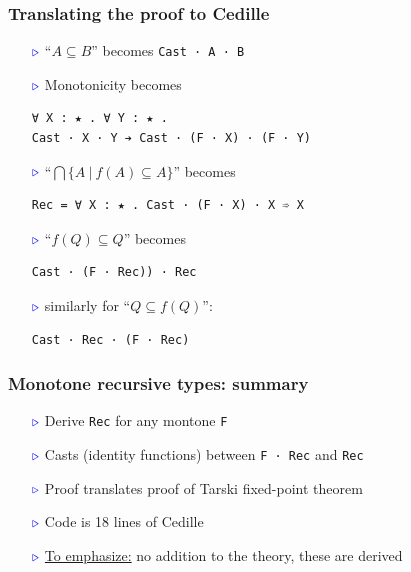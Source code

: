 \documentclass[11pt]{beamer}
\newcommand{\myb}[0]{\ensuremath{\textcolor{blue}{\triangleright}}}
\begin{document}
\begin{frame}[containsverbatim]
  \frametitle{Translating the proof to Cedille}

  \begin{itemize}
  \item[$\myb$] ``$A \subseteq B$'' becomes \verb|Cast · A · B|
  \item[$\myb$] Monotonicity becomes

    {\footnotesize
\begin{verbatim}
∀ X : ★ . ∀ Y : ★ . 
Cast · X · Y ➔ Cast · (F · X) · (F · Y) 
\end{verbatim}
}
  \item[$\myb$] ``$\bigcap\{ A\ |\ f(A) \subseteq A\}$'' becomes

{\footnotesize
\begin{verbatim}
Rec = ∀ X : ★ . Cast · (F · X) · X ➾ X 
\end{verbatim}
}

\item[$\myb$] ``$f(Q)\subseteq Q$'' becomes

{\footnotesize
\begin{verbatim}
Cast · (F · Rec)) · Rec 
\end{verbatim}
}

\item[$\myb$] similarly for ``$Q\subseteq f(Q)$'':

{\footnotesize
\begin{verbatim}
Cast · Rec · (F · Rec)
\end{verbatim}
}

\end{itemize}
\end{frame}

\begin{frame}[containsverbatim]
  \frametitle{Monotone recursive types: summary}

  \begin{itemize}
  \item[$\myb$] Derive \verb|Rec| for any montone \verb|F|
    \item[$\myb$] Casts (identity functions) between \verb|F · Rec| and \verb|Rec|
    \item[$\myb$] Proof translates proof of Tarski fixed-point theorem
    \item[$\myb$] Code is 18 lines of Cedille
\item[$\myb$] \underline{To emphasize:} no addition to the theory, these are derived
      \end{itemize}
\end{frame}
\end{document}
